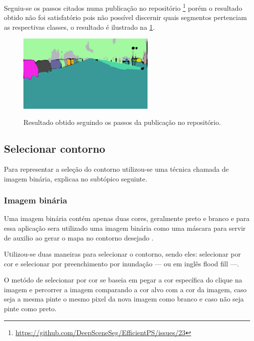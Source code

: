 Seguiu-se os passos citados numa publicação no repositório \footnote{\url{https://github.com/DeepSceneSeg/EfficientPS/issues/23}} porém o resultado obtido não foi satisfatório pois não possível discernir quais segmentos pertenciam as respectivas classes, o resultado é ilustrado na \cref{fig:resultado_obtido}.

\begin{figure}[!ht]
	\centering
    \caption{Resultado obtido seguindo os passos da publicação no repositório.}
	\includegraphics[width=0.6\textwidth]{figures/resultado_obtido.png}
	\label{fig:resultado_obtido}
\end{figure}

\subsection{Selecionar contorno}

Para representar a seleção do contorno utilizou-se uma técnica chamada de imagem binária, explicaa no subtópico seguinte.

\subsubsection{Imagem binária}

Uma imagem  binária contém  apenas duas cores, geralmente preto e  branco e para essa aplicação sera utilizado uma imagem binária como uma máscara para servir de auxilio ao  gerar o  mapa no contorno desejado \cite{Aznag2020}.

Utilizou-se duas maneiras para selecionar o contorno, sendo eles: selecionar por cor e selecionar por preenchimento por inundação — ou  em inglês  flood fill —.


O metódo de selecionar por cor se baseia em pegar a cor específica do clique na imagem e percorrer a imagem comparando a cor alvo com a cor da imagem, caso seja a mesma pinte o mesmo pixel da nova imagem como branco e caso não seja pinte como preto.

